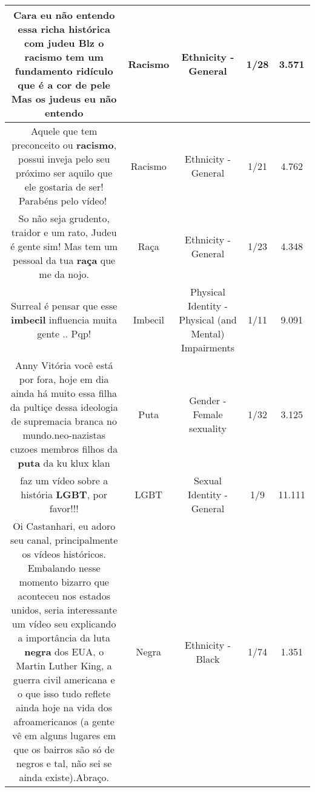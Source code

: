 \documentclass[11pt]{article}
\newlength\mylength
\begin{document}
\begin{center}
\begin{longtable}{|C{.65\mylength}|C{.30\mylength}|C{.12\mylength}|C{.12\mylength}|C{.12\mylength}|}
  \small Cara eu não entendo essa richa histórica com judeu Blz o \textbf{racismo} tem um fundamento ridículo que é a cor de pele Mas os judeus eu não entendo\normalsize   & Racismo & Ethnicity - General & 1/28 & 3.571 \\  \hline
  \small Aquele que tem preconceito ou \textbf{racismo}, possui inveja pelo seu próximo ser aquilo que ele gostaria de ser! Parabéns pelo vídeo!👏\normalsize   & Racismo & Ethnicity - General & 1/21 & 4.762 \\  \hline
  \small So não seja grudento, traidor e um rato, Judeu é gente sim! Mas tem um pessoal da tua \textbf{raça} que me da nojo.\normalsize   & Raça & Ethnicity - General & 1/23 & 4.348 \\  \hline
  \small Surreal é pensar que esse \textbf{imbecil} influencia muita gente .. Pqp!\normalsize   & Imbecil & Physical Identity - Physical (and Mental) Impairments & 1/11 & 9.091 \\  \hline
  \small Anny Vitória você está por fora, hoje em dia ainda há muito essa filha da pultiçe dessa ideologia de supremacia branca no mundo.neo-nazistas cuzoes membros filhos da \textbf{puta} da ku klux klan\normalsize   & Puta & Gender - Female sexuality & 1/32 & 3.125 \\  \hline
  \small faz um vídeo sobre a história \textbf{LGBT}, por favor!!!\normalsize   & LGBT & Sexual Identity - General & 1/9 & 11.111 \\  \hline
  \small Oi Castanhari, eu adoro seu canal, principalmente os vídeos históricos. Embalando nesse momento bizarro que aconteceu nos estados unidos, seria interessante um vídeo seu explicando a importância da luta \textbf{negra} dos EUA, o Martin Luther King, a guerra civil americana e o que isso tudo reflete ainda hoje na vida dos afroamericanos (a gente vê em alguns lugares em que os bairros são só de negros e tal, não sei se ainda existe).Abraço.\normalsize   & Negra & Ethnicity - Black & 1/74 & 1.351 \\  \hline

\end{longtable}
\end{center}
\end{document}
